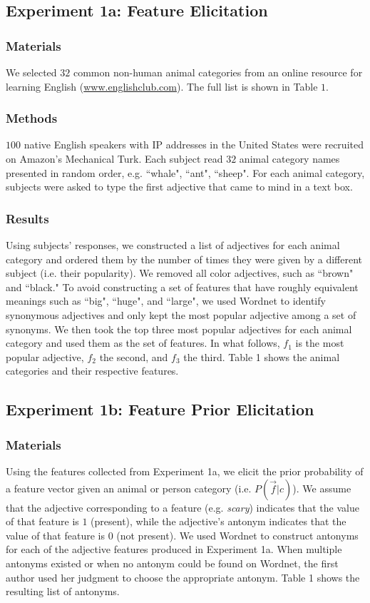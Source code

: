 \documentclass[10pt,letterpaper]{article}
\begin{document}
\subsection{Experiment 1a: Feature Elicitation}
\subsubsection{Materials}
We selected $32$ common non-human animal categories from an online resource for learning English (\url{www.englishclub.com}). The full list is shown in Table $1$.
\subsubsection{Methods}
$100$ native English speakers with IP addresses in the United States were recruited on Amazon's Mechanical Turk. Each subject read $32$ animal category names presented in random order, e.g. ``whale", ``ant", ``sheep". For each animal category, subjects were asked to type the first adjective that came to mind in a text box. 
\subsubsection{Results}
Using subjects' responses, we constructed a list of adjectives for each animal category and ordered them by the number of times they were given by a different subject (i.e. their popularity). We removed all color adjectives, such as ``brown" and ``black." To avoid constructing a set of features that have roughly equivalent meanings such as ``big", ``huge", and ``large", we used Wordnet \cite{Miller95wordnet:a} to identify synonymous adjectives and only kept the most popular adjective among a set of synonyms. We then took the top three most popular adjectives for each animal category and used them as the set of features. In what follows, $f_1$ is the most popular adjective, $f_2$ the second, and $f_3$ the third. Table 1 shows the animal categories and their respective features.

\subsection{Experiment 1b: Feature Prior Elicitation}
\subsubsection{Materials}
Using the features collected from Experiment 1a, we elicit the prior probability of a feature vector given an animal or person category (i.e. $P(\vec f | c)$). We assume that the adjective corresponding to a feature (e.g. \emph{scary}) indicates that the value of that feature is $1$ (present), while the adjective's antonym indicates that the value of that feature is $0$ (not present). We used Wordnet to construct antonyms for each of the adjective features produced in Experiment 1a. When multiple antonyms existed or when no antonym could be found on Wordnet, the first author used her judgment to choose the appropriate antonym. Table 1 shows the resulting list of antonyms. 
\end{document}
